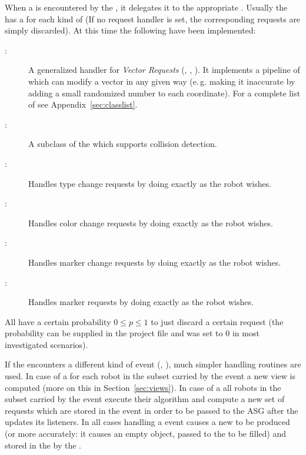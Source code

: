 When a  is encountered by the , it delegates it to the appropriate . Usually the  has a  for each kind of  (If no request handler is set, the corresponding requests are simply discarded).
At this time the following  have been implemented:

\begin{description}
\item[:] A generalized handler for \emph{Vector Requests} (, , ). It implements a pipeline of  which can modify a vector in any given way (e.\,g. making it inaccurate by adding a small randomized number to each coordinate). For a complete list of  see Appendix~\ref{sec:classlist}.
\item[:] A subclass of the  which supports collision detection.
\item[:] Handles type change requests by doing exactly as the robot wishes.
\item[:] Handles color change requests by doing exactly as the robot wishes.
\item[:] Handles marker change requests by doing exactly as the robot wishes.
\item[:] Handles marker requests by doing exactly as the robot wishes.
\end{description}
All  have a certain probability $0 \le p \le 1$ to just discard a certain request (the probability can be supplied in the project file and was set to $0$ in most investigated scenarios).

\noindent
If the  encounters a different kind of event (, ), much simpler handling routines are used. In case of a  for each robot in the subset carried by the event a new view is computed (more on this in Section~\ref{sec:views}). In case of a  all robots in the subset carried by the event execute their algorithm and compute a new set of requests which are stored in the event in order to be passed to the ASG after the  updates its listeners. In all cases handling a event causes a new  to be produced (or more accurately: it causes an empty  object, passed to the  to be filled) and stored in the  by the . \smallskip

